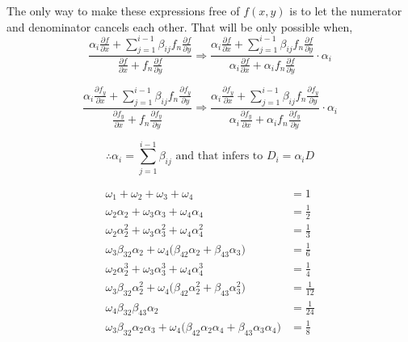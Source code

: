 \documentclass[12 pt]{article}
\begin{document}
	
	
	The only way to make these expressions free of $f(x,y)$ is to let the numerator and denominator cancels each other. That will be only possible when, $$\frac{\alpha_{i}\frac{\partial f}{\partial x} + \sum_{j=1}^{i-1}\beta_{ij}f_{n}\frac{\partial f}{\partial y}}{\frac{\partial f}{\partial x} + f_{n}\frac{\partial f}{\partial y}}\Rightarrow \frac{\alpha_{i}\frac{\partial f}{\partial x} + \sum_{j=1}^{i-1}\beta_{ij}f_{n}\frac{\partial f}{\partial y}}{\alpha_{i}\frac{\partial f}{\partial x} + \alpha_{i}f_{n}\frac{\partial f}{\partial y}}\cdot\alpha_{i}$$
	
	$$\frac{\alpha_{i}\frac{\partial f_{y}}{\partial x} + \sum_{j=1}^{i-1}\beta_{ij}f_{n}\frac{\partial f_{y}}{\partial y}}{\frac{\partial f_{y}}{\partial x} + f_{n}\frac{\partial f_{y}}{\partial y}}\Rightarrow \frac{\alpha_{i}\frac{\partial f_{y}}{\partial x} + \sum_{j=1}^{i-1}\beta_{ij}f_{n}\frac{\partial f_{y}}{\partial y}}{\alpha_{i}\frac{\partial f_{y}}{\partial x} + \alpha_{i}f_{n}\frac{\partial f_{y}}{\partial y}}\cdot\alpha_{i}$$
	
	$$\therefore \alpha_{i} = \sum_{j=1}^{i-1}\beta_{ij} \text{ and that infers to  } D_{i}=\alpha_{i} D$$
	
	\begin{align*}
		\omega_{1} + \omega_{2} + \omega_{3} + \omega_{4} &= 1\\
		\omega_{2}\alpha_{2} + \omega_{3}\alpha_{3} + \omega_{4}\alpha_{4} &= \frac{1}{2}\\
		\omega_{2}\alpha_{2}^{2} + \omega_{3}\alpha_{3}^{2} + \omega_{4}\alpha_{4}^{2} &= \frac{1}{3}\\
		\omega_{3}\beta_{32}\alpha_{2} + \omega_{4}\bigg(\beta_{42}\alpha_{2} + 
		\beta_{43}\alpha_{3}\bigg) &= \frac{1}{6}\\
		\omega_{2}\alpha_{2}^{3} + 
		\omega_{3}\alpha_{3}^{3} + 
		\omega_{4}\alpha_{4}^{3} &= \frac{1}{4}\\
		\omega_{3}\beta_{32}\alpha_{2}^{2} + \omega_{4}\bigg(\beta_{42}\alpha_{2}^{2} +
		\beta_{43}\alpha_{3}^{2}\bigg) &= \frac{1}{12}\\
		\omega_{4}\beta_{32}\beta_{43}\alpha_{2} &= \frac{1}{24}\\
		\omega_{3}\beta_{32}\alpha_{2}\alpha_{3}+ 
		\omega_{4}\bigg(\beta_{42}\alpha_{2}\alpha_{4} + 
		\beta_{43}\alpha_{3}\alpha_{4}\bigg) &= \frac{1}{8}
	\end{align*}
	
	
\end{document}
